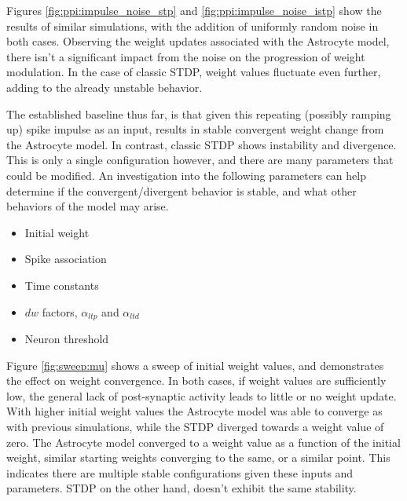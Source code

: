 
Figures \ref{fig:ppi:impulse_noise_stp} and \ref{fig:ppi:impulse_noise_istp}
show the results of similar simulations, with the addition of uniformly random
noise in both cases. Observing the weight updates associated with the Astrocyte
model, there isn't a significant impact from the noise on the progression of
weight modulation. In the case of classic STDP, weight values fluctuate even
further, adding to the already unstable behavior.



The established baseline thus far, is that given this repeating (possibly
ramping up) spike impulse as an input, results in stable convergent weight
change from the Astrocyte model. In contrast, classic STDP shows instability and
divergence. This is only a single configuration however, and there are many
parameters that could be modified. An investigation into the following
parameters can help determine if the convergent/divergent behavior is stable,
and what other behaviors of the model may arise.
\begin{itemize}
\item Initial weight
\item Spike association
\item Time constants
\item $dw$ factors, $\alpha_{ltp}$ and $\alpha_{ltd}$
\item Neuron threshold
\end{itemize}

Figure \ref{fig:sweep:mu} shows a sweep of initial weight values, and
demonstrates the effect on weight convergence. In both cases, if weight values
are sufficiently low, the general lack of post-synaptic activity leads to little
or no weight update. With higher initial weight values the Astrocyte model was
able to converge as with previous simulations, while the STDP diverged towards a
weight value of zero. The Astrocyte model converged to a weight value as a
function of the initial weight, similar starting weights converging to the same,
or a similar point. This indicates there are multiple stable configurations
given these inputs and parameters. STDP on the other hand, doesn't exhibit the
same stability.


